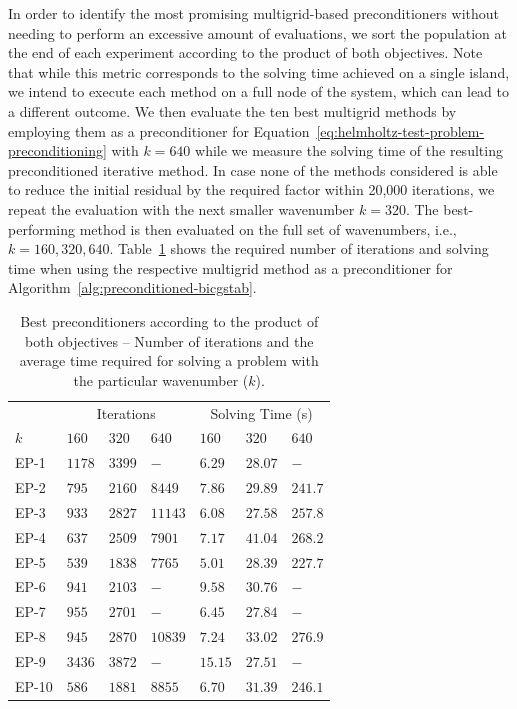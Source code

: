 In order to identify the most promising multigrid-based preconditioners without needing to perform an excessive amount of evaluations, we sort the population at the end of each experiment according to the product of both objectives.
Note that while this metric corresponds to the solving time achieved on a single island, we intend to execute each method on a full node of the system, which can lead to a different outcome.
We then evaluate the ten best multigrid methods by employing them as a preconditioner for Equation~\eqref{eq:helmholtz-test-problem-preconditioning} with $k = 640$ while we measure the solving time of the resulting preconditioned iterative method.
In case none of the methods considered is able to reduce the initial residual by the required factor within 20,000 iterations, we repeat the evaluation with the next smaller wavenumber $k = 320$.
The best-performing method is then evaluated on the full set of wavenumbers, i.e., $k = 160, 320, 640$.
Table~\ref{table:evolved-solvers} shows the required number of iterations and solving time when using the respective multigrid method as a preconditioner for Algorithm~\ref{alg:preconditioned-bicgstab}.
\begin{table}
	\caption{Best preconditioners according to the product of both objectives -- Number of iterations and the average time required for solving a problem with the particular wavenumber ($k$).}
	\label{table:evolved-solvers}
	\centering
	\begin{tabular}{l l l l l l l }
		\toprule
		& \multicolumn{3}{c}{Iterations} & \multicolumn{3}{c}{Solving Time (s)} \\
		\cmidrule(l){2-4} \cmidrule(l){5-7}
		$k$ & $160$ & $320$ & $640$ & $160$ & $320$ & $640$ \\
		\midrule
		EP-1 & $1178$ & $3399$ & $-$ & $6.29$ & $28.07$ & $-$ \\
		\midrule
		EP-2 & $795$ & $2160$ & $8449$ & $7.86$ & $29.89$ & $241.7$\\
		\midrule
		EP-3 & $933$ & $2827$ & $11143$ & $6.08$ & $27.58$ & $257.8$ \\
		\midrule
		EP-4 & $637$ & $2509$ & $7901$ & $7.17$& $41.04$ & $268.2$ \\
		\midrule
		EP-5 & $539$ & $1838$ & $7765$ & $5.01$ & $28.39$ & $227.7$ \\
		\midrule
		EP-6 & $941$ & $2103$ & $-$ & $9.58$ & $30.76$ & $-$ \\
		\midrule
		EP-7 & $955$ & $2701$ & $-$  & $6.45$& $27.84$ & $-$ \\
		\midrule
		EP-8 & $945$ & $2870$ & $10839$ & $7.24$ & $33.02$ & $276.9$ \\
		\midrule
		EP-9 & $3436$ & $3872$ & $-$  & $15.15$ & $27.51$ & $-$ \\
		\midrule
		EP-10 & $586$ & $1881$ & $8855$ & $6.70$ & $31.39$ & $246.1$ \\
		\bottomrule
	\end{tabular}
\end{table}
